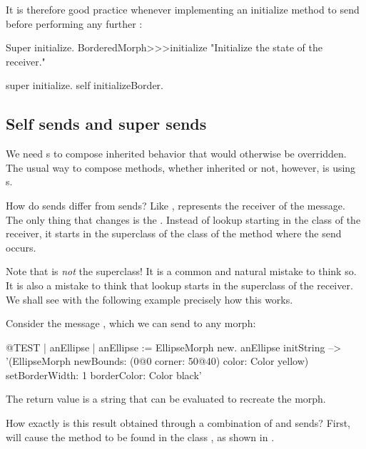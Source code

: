 \documentclass[a4paper,10pt,twoside]{book}
\begin{document}
It is therefore good practice whenever implementing an initialize method to send  before performing any further :

\begin{method}[morphinit]{Super initialize.}
BorderedMorph>>>initialize
	"Initialize the state of the receiver."

	super initialize.
	self initializeBorder.
\end{method}


\subsection{Self sends and super sends}

We need \super {}s to compose inherited behavior that would otherwise be overridden.
The usual way to compose methods, whether inherited or not, however, is using \self {}s.

How do \self sends differ from \super sends?
Like \self, \super represents the receiver of the message.
The only thing that changes is the .
Instead of lookup starting in the class of the receiver, it starts in the superclass of the class of the method where the \super send occurs.

Note that \super is \emph{not} the superclass!
It is a common and natural mistake to think so.
It is also a mistake to think that lookup starts in the superclass of the receiver.
We shall see with the following example precisely how this works.

Consider the message , which we can send to any morph:
\begin{code}{@TEST | anEllipse | anEllipse := EllipseMorph new.}
anEllipse initString --> '(EllipseMorph newBounds: (0@0 corner: 50@40) color: Color yellow) setBorderWidth: 1 borderColor: Color black'
\end{code}
The return value is a string that can be evaluated to recreate the morph.

How exactly is this result obtained through a combination of \self and \super sends?
First,  will cause the method  to be found in the class ,
as shown in .
\end{document}

